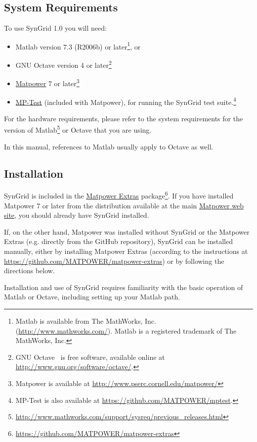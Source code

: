\documentclass[12pt]{article}
\newcommand{\matlab}[0]{{\sc Matlab}}
\newcommand{\matpower}[0]{{\sc Matpower}}
\newcommand{\matpowerurl}[0]{http://www.pserc.cornell.edu/matpower/}
\newcommand{\matpowerlink}[0]{\href{\matpowerurl}{\matpower{}}}
\newcommand{\matpowerextras}[0]{{\matpower{} Extras}}
\newcommand{\matpowerextrasurl}[0]{https://github.com/MATPOWER/matpower-extras}
\newcommand{\matpowerextraslink}[0]{\href{\matpowerextrasurl}{\matpowerextras{}}}
\newcommand{\mptest}[0]{{MP-Test}}
\newcommand{\mptesturl}[0]{https://github.com/MATPOWER/mptest}
\newcommand{\mptestlink}[0]{\href{\mptesturl}{\mptest{}}}
\newcommand{\syngrid}[0]{{SynGrid}}
\newcommand{\syngridver}[0]{1.0}
\numberwithin{equation}{section}
\numberwithin{table}{section}
\numberwithin{figure}{section}
\begin{document}
\subsection{System Requirements}
\label{sec:sysreq}
To use \syngrid{} \syngridver{} you will need:
\begin{itemize}
\item \matlab{}\textsuperscript{\tiny \textregistered} version 7.3 (R2006b) or later\footnote{\matlab{} is available from The MathWorks, Inc. (\url{http://www.mathworks.com/}). \matlab{} is a registered trademark of The MathWorks, Inc.}, or
\item GNU Octave version 4 or later\footnote{GNU Octave~\cite{octave} is free software, available online at \url{http://www.gnu.org/software/octave/}.}
\item \matpowerlink{} 7 or later\footnote{\matpower{} is available at \url{\matpowerurl}}
\item \mptestlink{} (included with \matpower{}), for running the \syngrid{} test suite.\footnote{\mptest{} is also available at \url{\mptesturl}.}
\end{itemize}

For the hardware requirements, please refer to the system requirements for the version of \matlab{}\footnote{\url{http://www.mathworks.com/support/sysreq/previous_releases.html}} or Octave that you are using.

In this manual, references to \matlab{} usually apply to Octave as well.

\subsection{Installation}
\label{sec:installation}

\syngrid{} is included in the \matpowerextraslink{} package\footnote{\url{\matpowerextrasurl}}. If you have installed \matpower{} 7 or later from the distribution available at the main \href{\matpowerurl}{\matpower{} web site}, you should already have \syngrid{} installed.

If, on the other hand, \matpower{} was installed without \syngrid{} or the  \matpowerextras{} (e.g. directly from the GitHub repository), \syngrid{} can be installed manually, either by installing \matpowerextras{} (according to the instructions at \url{\matpowerextrasurl}) or by following the directions below.

Installation and use of \syngrid{} requires familiarity with the basic operation of \matlab{} or Octave, including setting up your \matlab{} path.
\end{document}
